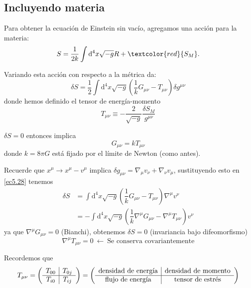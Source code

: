 \documentclass[../main]{subfiles}
\begin{document}
\subsection{Incluyendo materia}

Para obtener la ecuación de Einstein sin vacío, agregamos una acción para la materia:
\begin{equation}
    S=\dfrac{1}{2k}\int \mathrm{d}^4 x \sqrt{-g}R+\textcolor{red}{S_M}.
\end{equation} 

Variando esta acción con respecto a la métrica da:
\begin{equation}
    \delta S = \dfrac{1}{2}\int \mathrm{d}^4 x \sqrt{-g}\left(\dfrac{1}{k}G_{\mu\nu}-T_{\mu\nu}\right)\delta g^{\mu\nu}
    \label{ec5.28}
\end{equation}
donde hemos definido el tensor de energía-momento
\begin{equation}
    T_{\mu\nu}\equiv -\dfrac{2}{\sqrt{-g}}\dfrac{\delta S_M}{g^{\mu\nu}}
\end{equation}

$\delta S=0$ entonces implica 
\begin{equation}
    G_{\mu\nu} = k T_{\mu\nu}
\end{equation}
donde $k=8\pi G$ está fijado por el límite de Newton (como antes).

Recuerde que $x^{\mu} \rightarrow x^{\mu}-v^{\mu}$ implica $\delta g_{\mu\nu}=\nabla_{\mu}v_{\nu}+\nabla_{\nu}v_{\mu}$, sustituyendo esto en \eqref{ec5.28} tenemos
\begin{equation}
    \begin{split}
        \delta S &= \int \mathrm{d}^4 x \sqrt{-g}\left(\dfrac{1}{k}G_{\mu\nu}-T_{\mu\nu}\right)\nabla^{\mu}v^{\nu}\\
        &= - \int \mathrm{d}^4 x \sqrt{-g}\left(\dfrac{1}{k}\nabla^{\mu}G_{\mu\nu}-\nabla^{\mu}T_{\mu\nu}\right)v^{\nu}
    \end{split}
\end{equation}
ya que $\nabla^{\mu} G_{\mu\nu}=0$ (Bianchi), obtenemos $\delta S=0$ (invariancia bajo difeomorfismo)
\begin{equation}
    \nabla^{\mu}T_{\mu\nu}=0 \ \leftarrow \ \text{Se conserva covariantemente}
\end{equation}

Recordemos que 
\begin{equation}
    T_{\mu\nu}=
    \mleft(
    \begin{array}{c|c}
        T_{00} & T_{0j} \\ \hline
        T_{i0} & T_{ij}
    \end{array}
    \mright)
    =
    \mleft(
    \begin{array}{c|c}
        \text{densidad de energía} & \text{densidad de momento} \\ \hline
        \text{flujo de energía} & \text{tensor de estrés}
    \end{array}
    \mright)
\end{equation}
\end{document}
